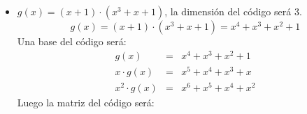\begin{itemize}
Una base del c\'odigo ser\'a:
\begin{eqnarray*}
g(x)&=&x^3+x^2+1\\
x\cdot g(x)&=&x^4+x^3+x\\
x^2\cdot g(x)&=&x^5+x^4+x^2\\
x^3\cdot g(x)&=&x^6+x^5+x^3
\end{eqnarray*}
Luego la matriz del c\'odigo ser\'a:
\begin{displaymath}
\left( \begin{array}{cccc}
1&0&0&0\\
0&1&0&0\\
1&0&1&0\\
1&1&0&1\\
0&1&1&0\\
0&0&1&1\\
0&0&0&1
\end{array} \right)
\end{displaymath}
La matriz de control del c\'odigo ser\'a la traspuesta de la matriz generadora
de su c\'odigo dual. Su c\'odigo dual estar\'a generado por:
\begin{displaymath}
p(x) = x^4\cdot h(\frac{1}{x}) = 1+x+x^2+x^4
\end{displaymath}
con $h(x)=(x+1)\cdot (x^3+x+1)$. Una base del c\'odigo dual ser\'a:
\begin{eqnarray*}
p(x)&=&x^4+x^2+x+1\\
x\cdot p(x)&=&x^5+x^3+x^2+x\\
x^2\cdot p(x)&=&x^6+x^4+x^3+x^2
\end{eqnarray*}
Luego la matriz de control ser\'a:
\begin{displaymath}
\left( \begin{array}{ccccccc}
1&1&1&0&1&0&0\\
0&1&1&1&0&1&0\\
0&0&1&1&1&0&1
\end{array} \right)
\end{displaymath}
\item $g(x)=(x+1)\cdot (x^3+x+1)$, la dimensi\'on del c\'odigo ser\'a $3$.
\begin{displaymath}
g(x)=(x+1)\cdot (x^3+x+1)=x^4+x^3+x^2+1
\end{displaymath}
Una base del c\'odigo ser\'a:
\begin{eqnarray*}
g(x)&=&x^4+x^3+x^2+1\\
x\cdot g(x)&=&x^5+x^4+x^3+x\\
x^2\cdot g(x)&=&x^6+x^5+x^4+x^2
\end{eqnarray*}
Luego la matriz del c\'odigo ser\'a:

\end{itemize}

